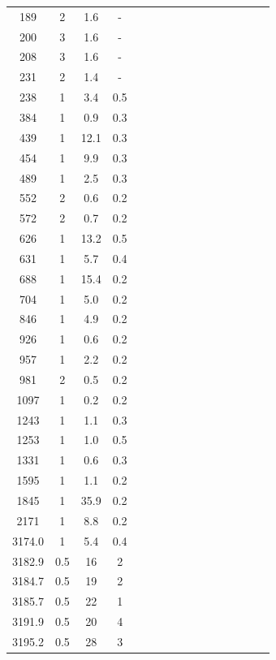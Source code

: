 \begin{ThreePartTable}
\begin{longtable}{*{16}{c}}
    189     &	2    &		1.6 \tnote{c}  &	-\\
    200     &	3    &		1.6 \tnote{c}  &	-\\
    208     &	3    &		1.6 \tnote{c}  &	-\\
    231     &	2    &		1.4 \tnote{c}  &	-\\
    238     &	1    &		3.4        &	0.5\\
    384     &	1    &		0.9        &	0.3\\
    439     &	1    &	    12.1       &	0.3\\
    454     &	1    &	    9.9        &	0.3\\
    489     &	1    &	    2.5        &	0.3\\
    552     &	2    &	    0.6        &	0.2\\
    572     &	2    &	    0.7        &	0.2\\
    626     &	1    &	    13.2       &	0.5\\
    631     &	1    &		5.7        &	0.4\\
    688     &	1    &		15.4       &	0.2\\
    704     &	1    &		5.0        &	0.2\\
    846     &	1    &	    4.9        &	0.2\\
    926     &	1    &	    0.6        &	0.2\\
    957     &	1    &	    2.2        &	0.2\\
    981     &	2    &	    0.5        &	0.2\\
    1097    &	1    &	    0.2        &	0.2\\
    1243    &	1    &	    1.1        &	0.3\\
    1253    &	1    &	    1.0        &	0.5\\
    1331    &	1    &	    0.6        &	0.3\\
    1595    &	1    &		1.1        &	0.2\\
    1845    &	1    &	    35.9       &	0.2\\
    2171    &	1    &	    8.8        &	0.2\\
    3174.0  &   1    &      5.4        &    0.4\\
    3182.9	&   0.5	 &      16	       &    2\\
    3184.7	&   0.5  &      19         &	2\\
    3185.7  &   0.5	 &      22         &	1\\
    3191.9	&   0.5	 &      20         &	4\\
    3195.2	&   0.5	 &      28	       &    3\\	

\end{longtable}
\end{ThreePartTable}
\clearpage

